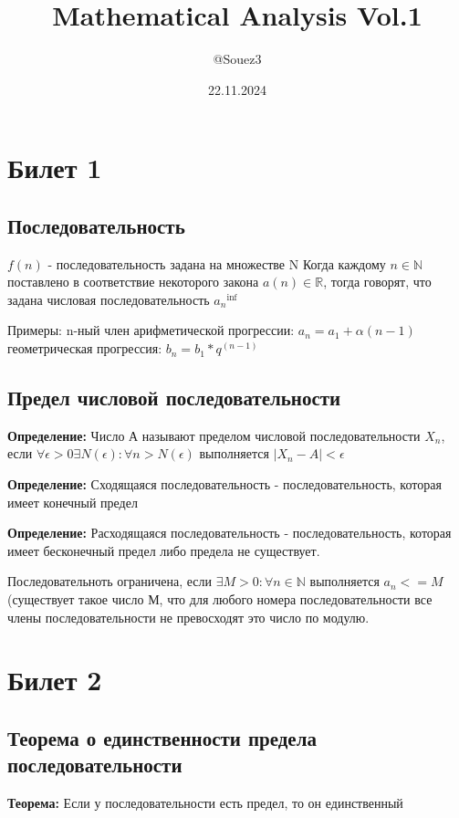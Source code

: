 \documentclass{article}
\title{Mathematical Analysis Vol.1}
\author{@Souez3}
\date{22.11.2024}
\begin{document}
\maketitle

\section{Билет 1}
\subsection{Последовательность}

${f(n)}$ - последовательность задана на множестве N
Когда каждому $n\in \mathds{N}$ поставлено в соответствие некоторого закона
$a(n)\in \mathds{R}$, тогда говорят, что задана числовая последовательность ${a_n}^\inf$

Примеры: 
n-ный член арифметической прогрессии: $a_n = a_1 + \alpha(n-1)$
геометрическая прогрессия: $b_n = b_1 * q^(n-1)$

\subsection{Предел числовой последовательности}
\textbf{Определение:} Число А называют пределом числовой
последовательности ${X_n}$, если $\forall \epsilon > 0 \exists N(\epsilon) : \forall n > N(\epsilon)$ выполняется $|X_n-A| < \epsilon$

\textbf{Определение:} Сходящаяся последовательность - последовательность, которая имеет конечный предел

\textbf{Определение:} Расходящаяся последовательность - последовательность, которая имеет бесконечный предел либо предела не существует.

Последовательноть ограничена, если $\exists M > 0 : \forall n \in \mathds{N}$ выполняется ${a_n} <= M$
(существует такое число М, что для любого номера последовательности все члены последовательности не превосходят это число по модулю.

\section{Билет 2}
\subsection{Теорема о единственности предела последовательности}

\textbf{Теорема:} Если у последовательности есть предел, то он единственный
\end{document}
